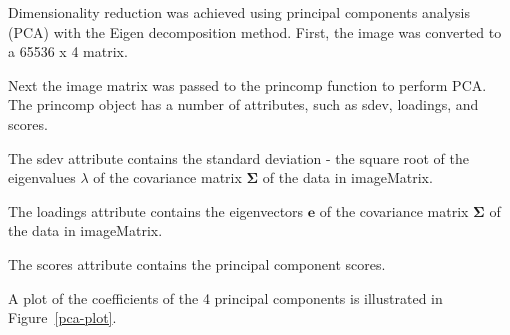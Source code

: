 \documentclass[conference,compsoc]{IEEEtran}
\begin{document}
Dimensionality reduction was achieved using principal components analysis (PCA) with the Eigen decomposition method. First, the image
was converted to a 65536 x 4 matrix.





Next the image matrix was passed to the princomp function to perform PCA. The princomp object has a number of attributes, such as sdev, loadings, and scores.



The sdev attribute contains the standard deviation - the square root of the eigenvalues $\lambda$ of the covariance matrix $\mathbf{\Sigma}$ of the data in imageMatrix.

The loadings attribute contains the eigenvectors $\mathbf{e}$ of the covariance matrix $\mathbf{\Sigma}$ of the data in imageMatrix.

The scores attribute contains the principal component scores.

A plot of the coefficients of the 4 principal components is illustrated in Figure~\ref{pca-plot}.


\end{document}
